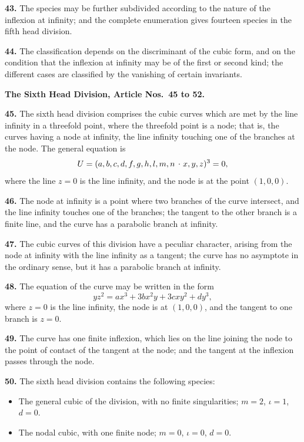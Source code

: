 \documentclass[11pt,a4paper]{article}
\theoremstyle{plain}
\theoremstyle{definition}
\newcommand{\lc}{\kern.17em\raise.5ex\hbox{.}\kern.08em}  %
\begin{document}
\textbf{43.} The species may be further subdivided according to the nature of the inflexion at infinity; and the complete enumeration gives fourteen species in the fifth head division.

\textbf{44.} The classification depends on the discriminant of the cubic form, and on the condition that the inflexion at infinity may be of the first or second kind; the different cases are classified by the vanishing of certain invariants.

\bigskip

\noindent\textbf{The Sixth Head Division, Article Nos.~45 to 52.}

\medskip

\textbf{45.} The sixth head division comprises the cubic curves which are met by the line infinity in a threefold point, where the threefold point is a node; that is, the curves having a node at infinity, the line infinity touching one of the branches at the node. The general equation is
\[
U = (a, b, c, d, f, g, h, l, m, n \mathbin{\lc} x, y, z)^3 = 0,
\]
where the line $z = 0$ is the line infinity, and the node is at the point $(1, 0, 0)$.

\textbf{46.} The node at infinity is a point where two branches of the curve intersect, and the line infinity touches one of the branches; the tangent to the other branch is a finite line, and the curve has a parabolic branch at infinity.

\textbf{47.} The cubic curves of this division have a peculiar character, arising from the node at infinity with the line infinity as a tangent; the curve has no asymptote in the ordinary sense, but it has a parabolic branch at infinity.

\textbf{48.} The equation of the curve may be written in the form
\[
yz^2 = ax^3 + 3bx^2y + 3cxy^2 + dy^3,
\]
where $z = 0$ is the line infinity, the node is at $(1, 0, 0)$, and the tangent to one branch is $z = 0$.

\textbf{49.} The curve has one finite inflexion, which lies on the line joining the node to the point of contact of the tangent at the node; and the tangent at the inflexion passes through the node.

\textbf{50.} The sixth head division contains the following species:
\begin{itemize}
\item[(1)] The general cubic of the division, with no finite singularities; $m = 2$, $\iota = 1$, $d = 0$.
\item[(2)] The nodal cubic, with one finite node; $m = 0$, $\iota = 0$, $d = 0$.
\end{itemize}
\end{document}

